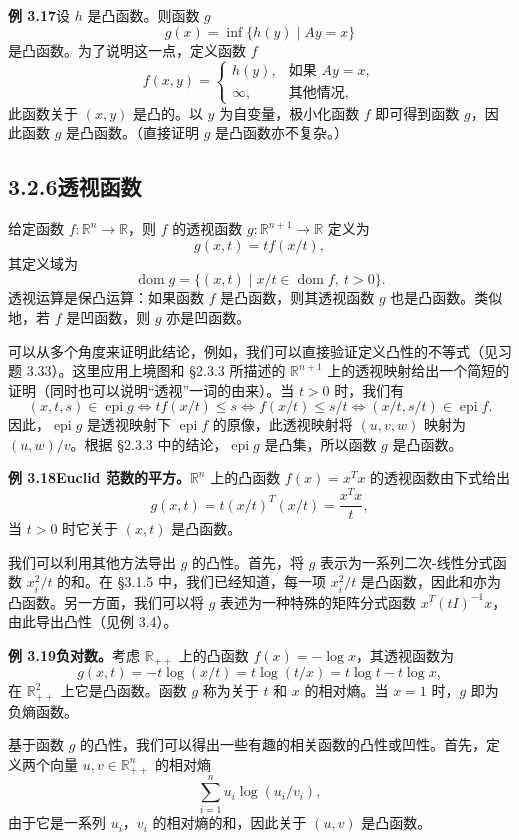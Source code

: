 \documentclass[UTF8,12pt,a4paper,fontset=fandol]{ctexart}
\DeclareMathOperator{\dom}{dom}
\DeclareMathOperator{\epi}{epi}
\begin{document}
\noindent\textbf{例 3.17}\quad 设 $h$ 是凸函数。则函数 $g$
\[
g(x)=\inf\{h(y)\mid Ay=x\}
\]
是凸函数。为了说明这一点，定义函数 $f$
\[
f(x,y)=
\begin{cases}
h(y), & \text{如果 }Ay=x,\\
\infty, & \text{其他情况},
\end{cases}
\]
此函数关于 $(x,y)$ 是凸的。以 $y$ 为自变量，极小化函数 $f$ 即可得到函数 $g$，因此函数 $g$ 是凸函数。（直接证明 $g$ 是凸函数亦不复杂。）

\subsection*{3.2.6\quad 透视函数}

给定函数 $f:\mathbb{R}^n\to\mathbb{R}$，则 $f$ 的透视函数 $g:\mathbb{R}^{n+1}\to\mathbb{R}$ 定义为
\[
g(x,t)=t f(x/t),
\]
其定义域为
\[
\dom g=\{(x,t)\mid x/t\in\dom f,\ t>0\}.
\]
透视运算是保凸运算：如果函数 $f$ 是凸函数，则其透视函数 $g$ 也是凸函数。类似地，若 $f$ 是凹函数，则 $g$ 亦是凹函数。

可以从多个角度来证明此结论，例如，我们可以直接验证定义凸性的不等式（见习题 3.33）。这里应用上境图和 \S2.3.3 所描述的 $\mathbb{R}^{n+1}$ 上的透视映射给出一个简短的证明（同时也可以说明“透视”一词的由来）。当 $t>0$ 时，我们有
\[
(x,t,s)\in\epi g
\Longleftrightarrow t f(x/t)\leq s
\Longleftrightarrow f(x/t)\leq s/t
\Longleftrightarrow (x/t,s/t)\in\epi f.
\]
因此，$\epi g$ 是透视映射下 $\epi f$ 的原像，此透视映射将 $(u,v,w)$ 映射为 $(u,w)/v$。根据 \S2.3.3 中的结论，$\epi g$ 是凸集，所以函数 $g$ 是凸函数。

\noindent\textbf{例 3.18\quad Euclid 范数的平方。}\quad $\mathbb{R}^n$ 上的凸函数 $f(x)=x^Tx$ 的透视函数由下式给出
\[
g(x,t)=t(x/t)^T(x/t)=\frac{x^Tx}{t},
\]
当 $t>0$ 时它关于 $(x,t)$ 是凸函数。

我们可以利用其他方法导出 $g$ 的凸性。首先，将 $g$ 表示为一系列二次-线性分式函数 $x_i^2/t$ 的和。在 \S3.1.5 中，我们已经知道，每一项 $x_i^2/t$ 是凸函数，因此和亦为凸函数。另一方面，我们可以将 $g$ 表述为一种特殊的矩阵分式函数 $x^T(tI)^{-1}x$，由此导出凸性（见例 3.4）。

\noindent\textbf{例 3.19\quad 负对数。}\quad 考虑 $\mathbb{R}_{++}$ 上的凸函数 $f(x)=-\log x$，其透视函数为
\[
g(x,t)=-t\log(x/t)=t\log(t/x)=t\log t-t\log x,
\]
在 $\mathbb{R}_{++}^2$ 上它是凸函数。函数 $g$ 称为关于 $t$ 和 $x$ 的相对熵。当 $x=1$ 时，$g$ 即为负熵函数。

基于函数 $g$ 的凸性，我们可以得出一些有趣的相关函数的凸性或凹性。首先，定义两个向量 $u,v\in\mathbb{R}_{++}^n$ 的相对熵
\[
\sum_{i=1}^n u_i\log(u_i/v_i),
\]
由于它是一系列 $u_i$，$v_i$ 的相对熵的和，因此关于 $(u,v)$ 是凸函数。
\end{document}
